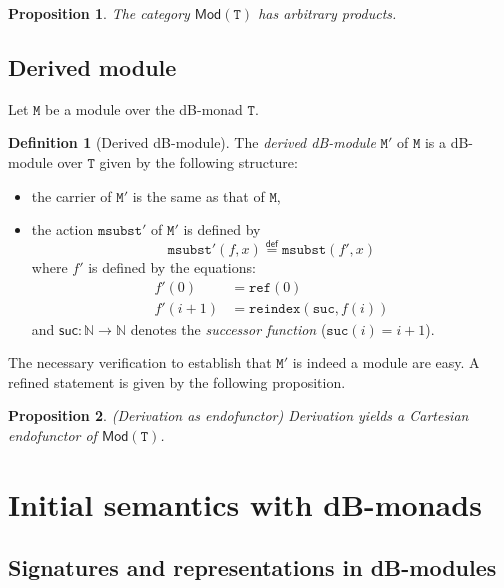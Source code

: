\documentclass[a4paper,twoside,12pt]{article}
\newtheorem{proposition}{Proposition}
\theoremstyle{definition}
\newtheorem{definition}{Definition}
\theoremstyle{remark}
\newcommand{\NN}{\mathbb{N}}
\newcommand{\refe}{\mathtt{ref}}
\newcommand{\reindex}{\mathtt{reindex}}
\newcommand{\TT}{\mathtt{T}}
\newcommand{\MM}{\mathtt{M}}
\newcommand{\msubst}{\mathtt{msubst}}
\begin{document}
\begin{proposition}
  \label{prop:modules-product}
  The category $\mathsf{Mod}(\TT)$ has arbitrary products.
\end{proposition}

\subsection{Derived module}
\label{sec:derived-module}

Let $\MM$ be a module over the dB-monad $\TT$.

\begin{definition}[Derived dB-module]
  The \emph{derived dB-module} $\MM'$ of $\MM$ is a dB-module over
  $\TT$ given by the following structure:
  \begin{itemize}
  \item the carrier of $\MM'$ is the same as that of $\MM$,
  \item the action $\msubst'$ of $\MM'$ is defined by
    \begin{equation*}
    \msubst'(f,x) \stackrel{\mathsf{def}}{=} \msubst(f',x)
  \end{equation*}
  where $f'$ is defined by the equations:
  \begin{align*}
    f'(0) &= \refe(0)\\
    f'(i+1) &= \reindex(\mathtt{suc},f(i))
  \end{align*}
  and $\mathsf{suc} \colon \NN \to \NN$ denotes the \emph{successor
    function} ($\mathtt{suc}(i) = i+1$).
  \end{itemize}
\end{definition}

The necessary verification to establish that $\MM'$ is indeed a module
are easy.  A refined statement is given by the following proposition.

\begin{proposition}(Derivation as endofunctor)
  \label{prop:derivation-endo}
  Derivation yields a Cartesian endofunctor of $\mathsf{Mod}(\TT)$.
\end{proposition}

\section{Initial semantics with dB-monads}
\label{sec:init-semantics}

\subsection{Signatures and representations in dB-modules}
\label{sec:signatures-representations}
\end{document}
